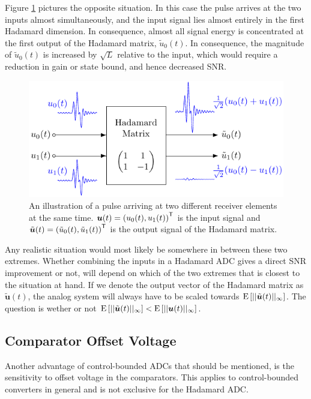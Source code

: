 Figure \ref{fig:hadamard_dimension} pictures the opposite situation. In this case the pulse arrives at the two inputs almost simultaneously, and the input signal lies almost entirely in the first Hadamard dimension. In consequence, almost all signal energy is concentrated at the first output of the Hadamard matrix, $\tilde{u}_0(t)$. In consequence, the magnitude of $\tilde{u}_0(t)$ is increased by $\sqrt{L}$ relative to the input, which would require a reduction in gain or state bound, and hence decreased SNR.
\begin{figure}[htbp]
    \centering
    \includegraphics[width=\linewidth]{figures/05hadamard/hadamard_dimension.pdf}
    \caption{An illustration of a pulse arriving at two different receiver elements at the same time. $\bm{u}(t) = \left( u_0(t) , u_1(t) \right)^\mathsf{T}$ is the input signal and $\tilde{\bm{u}}(t) = \left( \tilde{u}_0(t) , \tilde{u}_1(t) \right)^\mathsf{T}$ is the output signal of the Hadamard matrix.}
    \label{fig:hadamard_dimension}
\end{figure}

Any realistic situation would most likely be somewhere in between these two extremes. Whether combining the inputs in a Hadamard ADC gives a direct SNR improvement or not, will depend on which of the two extremes that is closest to the situation at hand. If we denote the output vector of the Hadamard matrix as $\tilde{\bm{u}}(t)$, the analog system will always have to be scaled towards $\text{E} \left[ ||\tilde{\bm{u}}(t)||_{\infty} \right]$. The question is wether or not $\text{E} \left[ ||\tilde{\bm{u}}(t)||_{\infty} \right] < \text{E} \left[ ||\bm{u}(t)||_{\infty} \right]$.






\subsection{Comparator Offset Voltage}
Another advantage of control-bounded ADCs that should be mentioned, is the sensitivity to offset voltage in the comparators. This applies to control-bounded converters in general and is not exclusive for the Hadamard ADC.

